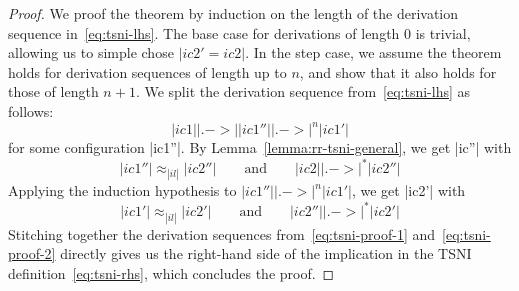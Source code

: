 \begin{proof}
  We proof the theorem by induction on the length of the derivation sequence in~\eqref{eq:tsni-lhs}.
  The base case for derivations
  of length 0 is trivial, allowing
  us to simple chose $|ic2'=ic2|$.  In the step case, we assume
  the theorem holds for derivation sequences of length up to $n$, and show that it also
  holds for those of length $n+1$.  We split the derivation sequence from~\eqref{eq:tsni-lhs} as follows:
  \[
  |ic1| |.->| |ic1''| |.->|^n |ic1'|
  \]
  for some configuration |ic1''|.  By Lemma~\ref{lemma:rr-tsni-general}, we get
  |ic''| with
  \begin{equation} \label{eq:tsni-proof-1}
  |ic1''| \approx_{|il|} |ic2''|
  \qquad \text{and} \qquad
  |ic2| |.->|^* |ic2''|
  \end{equation}
  Applying the induction hypothesis to
  $|ic1''| |.->|^n |ic1'|$, we get |ic2'| with
  \begin{equation} \label{eq:tsni-proof-2}
  |ic1'| \approx_{|il|} |ic2'|
  \qquad \text{and} \qquad
  |ic2''| |.->|^* |ic2'|
  \end{equation}
  Stitching together the derivation sequences from~\eqref{eq:tsni-proof-1} and~\eqref{eq:tsni-proof-2} directly gives
  us the right-hand side of the implication in the TSNI
  definition~\eqref{eq:tsni-rhs}, which concludes the proof.
\end{proof}
